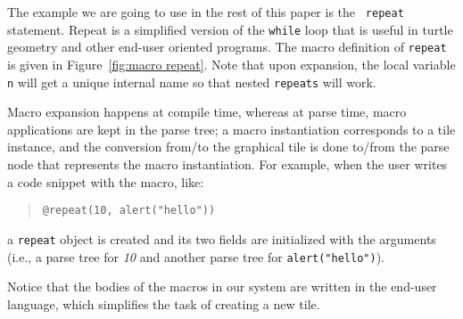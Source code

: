   The example we are going to use in the rest of this paper is the {\tt
repeat} statement.  Repeat is a simplified version of the {\tt while} loop
that is useful in turtle geometry and other end-user oriented
programs.  The macro definition of {\tt repeat} is given in Figure~\ref{fig:macro repeat}.
Note that upon expansion, the local variable {\tt n}
will get a unique internal name so that nested {\tt repeats} will work.

  Macro expansion happens at compile time, whereas at parse time, macro
applications are kept in the parse tree; a macro instantiation
corresponds to a tile instance, and the conversion from/to the
graphical tile is done to/from the parse node that represents the
macro instantiation.  For example, when the user writes a code snippet
with the macro, like:
\begin{quote}
{\tt @repeat(10, alert("hello"))}
\end{quote}
a {\tt repeat} object is created and its two fields are initialized
with the arguments (i.e., a parse tree for {\em 10} and another parse tree for
{\tt alert("hello")}).

  Notice that the bodies of the macros in our system are written in the end-user language,
which simplifies the task of creating a new tile.





